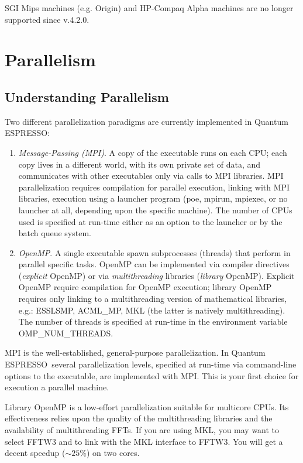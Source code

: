 \documentclass[12pt,a4paper]{article}
\def\version{4.2.0}
\def\qe{{\sc Quantum ESPRESSO}}
\begin{document}
SGI Mips machines (e.g. Origin) and HP-Compaq Alpha machines are
no longer supported since v.\version.

\newpage

\section{Parallelism}
\label{Sec:para}

\subsection{Understanding Parallelism}

Two different parallelization paradigms are currently implemented 
in \qe:
\begin{enumerate}
\item {\em Message-Passing (MPI)}. A copy of the executable runs 
on each CPU; each copy lives in a different world, with its own
private set of data, and communicates with other executables only
via calls to MPI libraries. MPI parallelization requires compilation 
for parallel execution, linking with MPI libraries, execution using 
a launcher program (poe, mpirun, mpiexec, or no launcher at all,
depending upon the specific machine). The number of CPUs used
is specified at run-time either as an option to the launcher or
by the batch queue system. 
\item {\em OpenMP}.  A single executable spawn subprocesses
(threads) that perform in parallel specific tasks. 
OpenMP can be implemented via compiler directives ({\em explicit} 
OpenMP) or via {\em multithreading} libraries  ({\em library} OpenMP).
Explicit OpenMP require compilation for OpenMP execution;
library OpenMP requires only linking to a multithreading
version of mathematical libraries, e.g.:
ESSLSMP, ACML\_MP, MKL (the latter is natively multithreading).
The number of threads is specified at run-time in the environment 
variable OMP\_NUM\_THREADS. 
\end{enumerate}

MPI is the well-established, general-purpose parallelization.
In \qe\ several parallelization levels, specified at run-time
via command-line options to the executable, are implemented
with MPI. This is your first choice for execution a parallel 
machine.

Library OpenMP is a low-effort parallelization suitable for
multicore CPUs. Its effectiveness relies upon the quality of 
the multithreading libraries and the availability of 
multithreading FFTs. If you are using MKL, you may want 
to select FFTW3 and to link with the MKL interface to FFTW3. 
You will get a decent speedup ($\sim 25$\%) on two cores.
\end{document}

